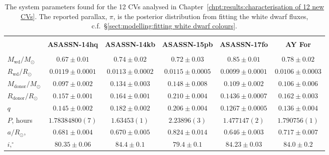 \begin{landscape}

    \begin{table*}
        \centering
        \caption{The system parameters found for the 12 CVs analysed in Chapter~\ref{chpt:results:characterisation of 12 new CVs}. The reported parallax, $\pi$, is the posterior distribution from fitting the white dwarf fluxes, c.f.~\S\ref{sect:modelling:fitting white dwarf colours}.}
        \label{appendix:table:12 new cvs:system_parameters}
        \begin{tabular}{lccccc}
            \hline \\
            ~                          & \textbf{ASASSN-14hq}    & \textbf{ASASSN-14kb}     & \textbf{ASASSN-15pb}      & \textbf{ASASSN-17fo}      & \textbf{AY For}       \\
            \hline \hline \\
            $M_\mathrm{wd}/M_\odot$    & $0.67\pm0.01$           & $0.74\pm0.02$            & $0.72\pm0.03$             & $0.85\pm0.01$             & $0.78\pm0.02$         \\
            $R_\mathrm{wd}/R_\odot$    & $0.0119\pm0.0001$       & $0.0113\pm0.0002$        & $0.0115\pm0.0005$         & $0.0099\pm0.0001$         & $0.0106\pm0.0003$ \\
            $M_\mathrm{donor}/M_\odot$ & $0.097\pm0.002$         & $0.134\pm0.003$          & $0.148\pm0.008$           & $0.109\pm0.002$           & $0.106\pm0.006$ \\
            $R_\mathrm{donor}/R_\odot$ & $0.157\pm0.001$         & $0.164\pm0.001$          & $0.210\pm0.004$           & $0.1436\pm0.0007$         & $0.162\pm0.003$ \\
            $q$                        & $0.145\pm0.002$         & $0.182\pm0.002$          & $0.206\pm0.004$           & $0.1267\pm0.0005$         & $0.136\pm0.004$ \\
            \hline
            $P$, hours                 & $1.78384800(7)$         & $1.63453(1)$             & $2.23896(3)$              & $1.477147(2)$             & $1.790756(1)$ \\
            $a/R_\odot$,               & $0.681\pm0.004$         & $0.670\pm0.005$          & $0.824\pm0.014$           & $0.646\pm0.003$           & $0.717\pm0.007$ \\
            $i, ^\circ$                & $80.35\pm0.06$          & $84.4\pm0.1$             & $79.4\pm0.1$              & $84.23\pm0.03$            & $84.0\pm0.2$ \\

\end{tabular}
\end{table*}
\end{landscape}
